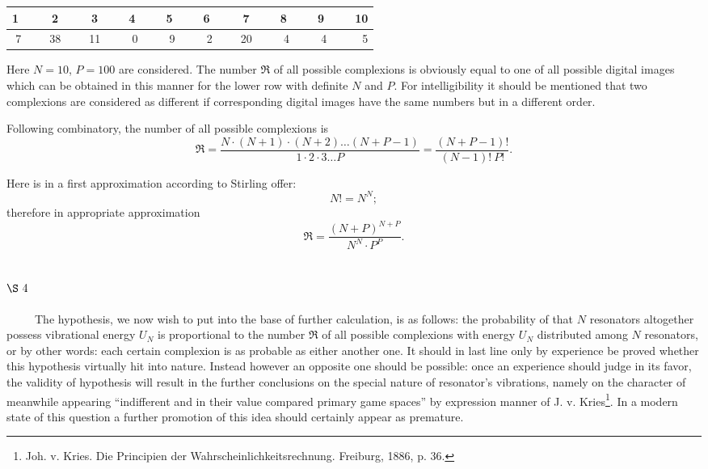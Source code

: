 \documentclass{article}
\begin{document}
\vspace{0.1cm}

\begin{center}
\begin{tabular}{rrrrrrrrrr}
1~~~&2~~~&3~~~&4~~~&5~~~&6~~~&7~~~&8~~~&9~~~&10\\[0.1cm]
\hline
7~~~&38~~~&11~~~&0~~~&9~~~&2~~~&20~~~&4~~~&4~~~&5\\
\end{tabular}
\end{center}

\vspace{0.2cm}
Here $N = 10$, $P = 100$ are considered. 
The number $\Re$ of all possible complexions is obviously equal to one 
of all possible digital images which can be obtained in this manner 
for the lower row with definite $N$ and $P$.
For intelligibility it should be mentioned that two complexions are considered 
as different if corresponding digital images have the same numbers but in 
a different order. 

Following combinatory, the number of all possible complexions is
$$
\Re = \frac{N\cdot(N + 1)\cdot(N + 2)\ldots(N + P - 1)}
 {1 \cdot 2 \cdot 3 \ldots P} = \frac{(N + P - 1)!}{(N - 1)!~P!}.
$$

Here is in a first approximation according to Stirling offer:
$$
N! = N^N;
$$
therefore in appropriate approximation
$$
\Re = \frac{(N + P)^{N + P}}
{N^N \cdot P^P}.
$$

\vspace{0.5cm}
\subsection*{
{\bf $\S~4$}}
\vspace{0.3cm}

~~~~~The hypothesis, we now wish to put into the base of further 
calculation, is as follows: the probability of that $N$ resonators altogether 
possess vibrational energy $U_N$ is proportional to the number $\Re$ of all 
possible complexions with energy $U_N$ distributed among $N$ resonators, or 
by other words: each certain complexion is as probable as either another one.
It should in last line only by experience be proved
whether this hypothesis virtually hit into nature.
Instead however an opposite one should be possible: 
once an experience should judge in its favor, 
the validity of hypothesis will result in 
the further conclusions on the special nature of resonator's vibrations, 
namely on the character of meanwhile appearing 
``indifferent and in their value compared primary game spaces''
by expression manner of J. v. Kries\footnote{Joh. v. Kries. Die
Principien der Wahrscheinlichkeitsrechnung. Freiburg, 1886, p. 36.}. 
In a modern state of this question a further promotion of this idea 
should certainly appear as premature.
\end{document}
